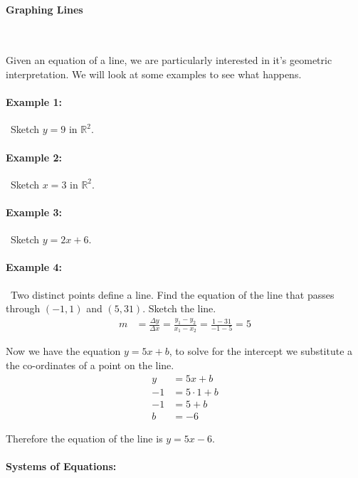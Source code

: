 \documentclass[english,12pt]{article}
\theoremstyle{plain}
\theoremstyle{definition}
\theoremstyle{definition} %
\newcommand{\R}{\mathbb{R}} %
\begin{document}
\paragraph{Graphing Lines}\

Given an equation of a line, we are particularly interested in it's geometric interpretation.  We will look at some examples to see what happens.

\paragraph{Example 1:}\
Sketch $y=9$ in $\R^2$.
\vspace{30 mm}

\paragraph{Example 2:}\
Sketch $x=3$ in $\R^2$.
\vspace{30 mm}

\paragraph{Example 3:}\
Sketch $y=2x+6$.
\vspace{30 mm}

\paragraph{Example 4:}\
Two distinct points define a line.  Find the equation of the line that passes through $(-1,1)$ and $(5,31)$.  Sketch the line.
\begin{align*}
m&=\frac{\Delta y}{\Delta x}
=\frac{y_1-y_2}{x_1-x_2}
=\frac{1-31}{-1-5}
=5
\end{align*}

Now we have the equation $y=5x+b$, to solve for the intercept we substitute a the co-ordinates of a point on the line.
\begin{align*}
y&=5x+b\\
-1&=5\cdot 1+b\\
-1&=5+b\\
b&=-6
\end{align*}

Therefore the equation of the line is $y=5x-6$.

\paragraph{Systems of Equations:}\
\end{document}
